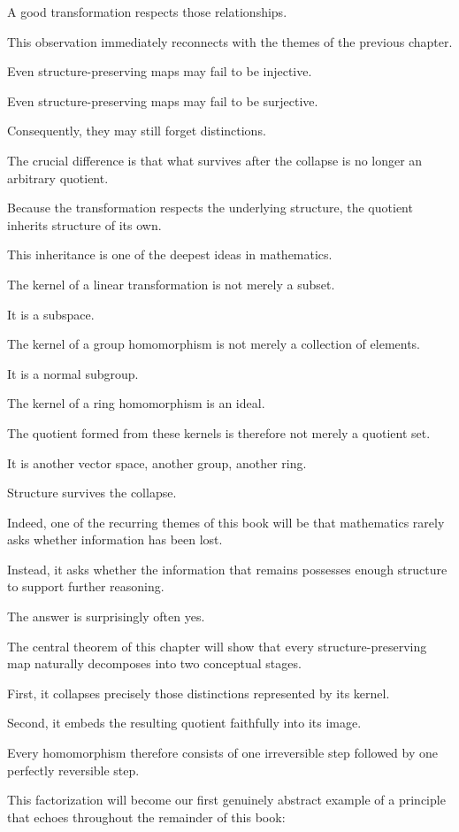 \documentclass[11pt]{book}
\numberwithin{equation}{chapter}
\theoremstyle{definition}
\theoremstyle{plain}
\theoremstyle{remark}
\begin{document}
A good transformation respects those relationships.

This observation immediately reconnects with the themes of the previous chapter.

Even structure-preserving maps may fail to be injective.

Even structure-preserving maps may fail to be surjective.

Consequently, they may still forget distinctions.

The crucial difference is that what survives after the collapse is no longer an arbitrary quotient.

Because the transformation respects the underlying structure, the quotient inherits structure of its own.

This inheritance is one of the deepest ideas in mathematics.

The kernel of a linear transformation is not merely a subset.

It is a subspace.

The kernel of a group homomorphism is not merely a collection of elements.

It is a normal subgroup.

The kernel of a ring homomorphism is an ideal.

The quotient formed from these kernels is therefore not merely a quotient set.

It is another vector space, another group, another ring.

Structure survives the collapse.

Indeed, one of the recurring themes of this book will be that mathematics rarely asks whether information has been lost.

Instead, it asks whether the information that remains possesses enough structure to support further reasoning.

The answer is surprisingly often yes.

The central theorem of this chapter will show that every structure-preserving map naturally decomposes into two conceptual stages.

First, it collapses precisely those distinctions represented by its kernel.

Second, it embeds the resulting quotient faithfully into its image.

Every homomorphism therefore consists of one irreversible step followed by one perfectly reversible step.

This factorization will become our first genuinely abstract example of a principle that echoes throughout the remainder of this book:
\end{document}
